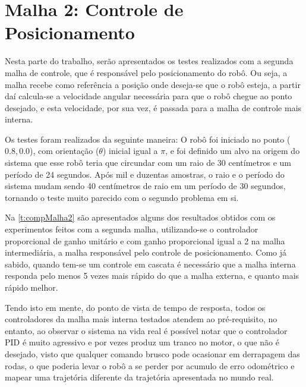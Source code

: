  \section{Malha 2: Controle de Posicionamento}
 \label{m2}
 Nesta parte do trabalho, serão apresentados os testes realizados com a segunda malha de controle, que é responsável pelo posicionamento do robô. Ou seja, a malha recebe como referência a posição onde deseja-se que o robô esteja, a partir daí calcula-se a velocidade angular necessária para que o robô chegue ao ponto desejado, e esta velocidade, por sua vez, é passada para a malha de controle mais interna. 
 
 Os testes foram realizados da seguinte maneira: O robô foi iniciado no ponto ($0.8,0.0$), com orientação ($\theta$) inicial igual a $\pi$, e foi definido um alvo na origem do sistema que esse robô teria que circundar com um raio de 30 centímetros e um período de 24 segundos. Após mil e duzentas amostras, o raio e o período do sistema mudam sendo 40 centímetros de raio em um período de 30 segundos, tornando o teste muito parecido com o segundo problema em si.
 
 Na \autoref{t:compMalha2} são apresentados alguns dos resultados obtidos com os experimentos feitos com a segunda malha, utilizando-se o controlador proporcional de ganho unitário e com ganho proporcional igual a 2 na malha intermediária, a malha responsável pelo controle de posicionamento. Como já sabido, quando tem-se um controle em cascata é necessário que a malha interna responda pelo menos 5 vezes mais rápido do que a malha externa, e quanto mais rápido melhor.
 
 Tendo isto em mente, %
 do ponto de vista de tempo de resposta, %
 todos os controladores da malha mais interna testados atendem ao pré-requisito, no entanto, ao observar o sistema na vida real é possível notar que o controlador PID é muito agressivo e por vezes produz um tranco no motor, o que não é desejado, visto que qualquer comando brusco pode ocasionar em derrapagem das rodas, o que poderia levar o robô a se perder por acumulo de erro odométrico e mapear uma trajetória diferente da trajetória apresentada no mundo real.
 
